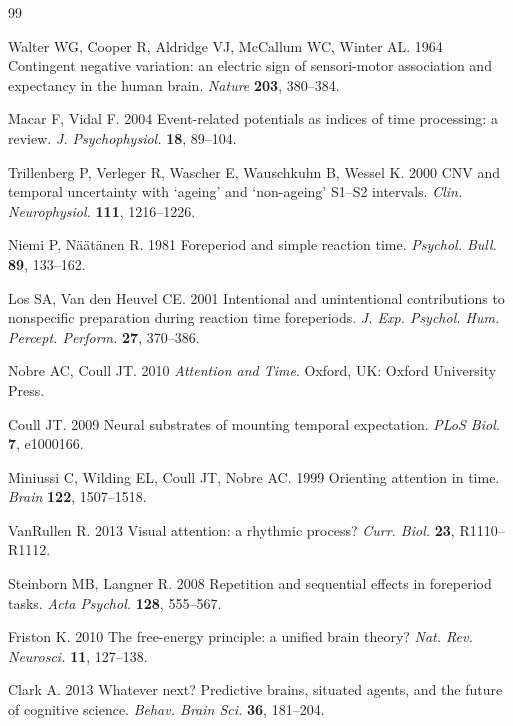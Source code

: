 \documentclass[11pt,a4paper]{article}
\theoremstyle{definition}
\begin{document}
\begin{thebibliography}{99}

Walter WG, Cooper R, Aldridge VJ, McCallum WC, Winter AL. 1964 Contingent
negative variation: an electric sign of sensori-motor association and expectancy
in the human brain. \textit{Nature} \textbf{203}, 380--384.

Macar F, Vidal F. 2004 Event-related potentials as indices of time processing:
a review. \textit{J. Psychophysiol.} \textbf{18}, 89--104.

Trillenberg P, Verleger R, Wascher E, Wauschkuhn B, Wessel K. 2000 CNV and
temporal uncertainty with `ageing' and `non-ageing' S1--S2 intervals.
\textit{Clin. Neurophysiol.} \textbf{111}, 1216--1226.

Niemi P, N\"a\"at\"anen R. 1981 Foreperiod and simple reaction time.
\textit{Psychol. Bull.} \textbf{89}, 133--162.

Los SA, Van den Heuvel CE. 2001 Intentional and unintentional contributions to
nonspecific preparation during reaction time foreperiods.
\textit{J. Exp. Psychol. Hum. Percept. Perform.} \textbf{27}, 370--386.

Nobre AC, Coull JT. 2010 \textit{Attention and Time}. Oxford, UK: Oxford
University Press.

Coull JT. 2009 Neural substrates of mounting temporal expectation.
\textit{PLoS Biol.} \textbf{7}, e1000166.

Miniussi C, Wilding EL, Coull JT, Nobre AC. 1999 Orienting attention in time.
\textit{Brain} \textbf{122}, 1507--1518.

VanRullen R. 2013 Visual attention: a rhythmic process?
\textit{Curr. Biol.} \textbf{23}, R1110--R1112.

Steinborn MB, Langner R. 2008 Repetition and sequential effects in foreperiod
tasks. \textit{Acta Psychol.} \textbf{128}, 555--567.

Friston K. 2010 The free-energy principle: a unified brain theory?
\textit{Nat. Rev. Neurosci.} \textbf{11}, 127--138.

Clark A. 2013 Whatever next? Predictive brains, situated agents, and the future
of cognitive science. \textit{Behav. Brain Sci.} \textbf{36}, 181--204.


\end{thebibliography}
\end{document}
